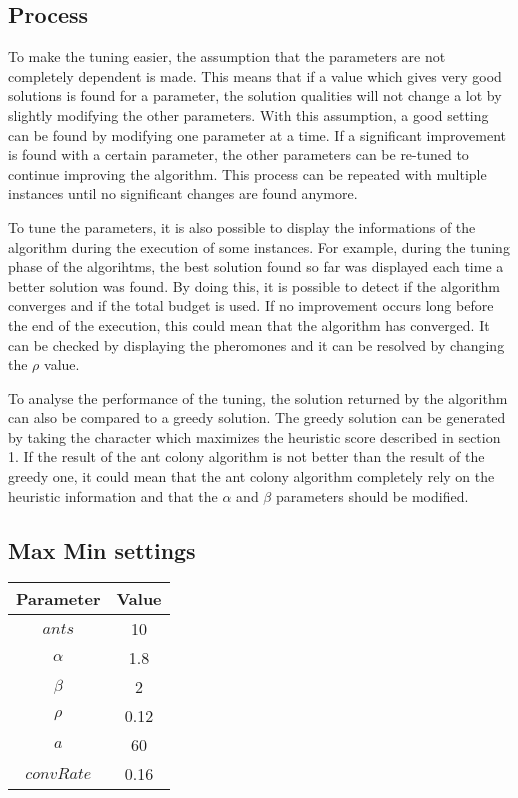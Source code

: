 \documentclass{article}
\begin{document}
\subsection{Process}

To make the tuning easier, the assumption that the parameters are not completely dependent is made.
This means that if a value which gives very good solutions is found for a parameter, the solution qualities will not change a lot by slightly modifying the other parameters.
With this assumption, a good setting can be found by modifying one parameter at a time.
If a significant improvement is found with a certain parameter, the other parameters can be re-tuned to continue improving the algorithm.
This process can be repeated with multiple instances until no significant changes are found anymore.\newline

To tune the parameters, it is also possible to display the informations of the algorithm during the execution of some instances.
For example, during the tuning phase of the algorihtms, the best solution found so far was displayed each time a better solution was found.
By doing this, it is possible to detect if the algorithm converges and if the total budget is used.
If no improvement occurs long before the end of the execution, this could mean that the algorithm has converged.
It can be checked by displaying the pheromones and it can be resolved by changing the $\rho$ value.\newline

To analyse the performance of the tuning, the solution returned by the algorithm can also be compared to a greedy solution.
The greedy solution can be generated by taking the character which maximizes the heuristic score described in section 1.
If the result of the ant colony algorithm is not better than the result of the greedy one, it could mean that the ant colony algorithm completely rely on the heuristic information and that the $\alpha$ and $\beta$ parameters should be modified.


\subsection{Max Min settings}

\begin{tabular}{c|c}
    Parameter & Value \\ \hline
    $ants$    & 10    \\
    $\alpha$  & 1.8   \\
    $\beta$   & 2     \\
    $\rho$    & 0.12  \\
    $a$       & 60    \\
    $convRate$& 0.16  \\
\end{tabular}
\end{document}
